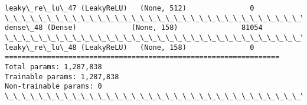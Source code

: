 \documentclass[11pt]{article}
\begin{document}
\begin{Verbatim}[commandchars=\\\{\}]
leaky\_re\_lu\_47 (LeakyReLU)   (None, 512)               0         
\_\_\_\_\_\_\_\_\_\_\_\_\_\_\_\_\_\_\_\_\_\_\_\_\_\_\_\_\_\_\_\_\_\_\_\_\_\_\_\_\_\_\_\_\_\_\_\_\_\_\_\_\_\_\_\_\_\_\_\_\_\_\_\_\_
dense\_48 (Dense)             (None, 158)               81054     
\_\_\_\_\_\_\_\_\_\_\_\_\_\_\_\_\_\_\_\_\_\_\_\_\_\_\_\_\_\_\_\_\_\_\_\_\_\_\_\_\_\_\_\_\_\_\_\_\_\_\_\_\_\_\_\_\_\_\_\_\_\_\_\_\_
leaky\_re\_lu\_48 (LeakyReLU)   (None, 158)               0         
=================================================================
Total params: 1,287,838
Trainable params: 1,287,838
Non-trainable params: 0
\_\_\_\_\_\_\_\_\_\_\_\_\_\_\_\_\_\_\_\_\_\_\_\_\_\_\_\_\_\_\_\_\_\_\_\_\_\_\_\_\_\_\_\_\_\_\_\_\_\_\_\_\_\_\_\_\_\_\_\_\_\_\_\_\_

    \end{Verbatim}
\end{document}
